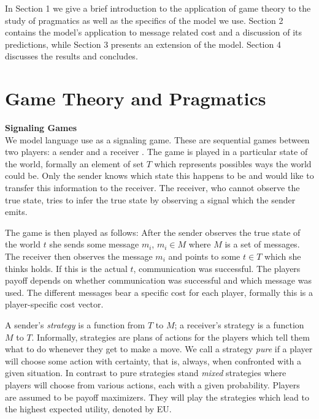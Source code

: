 \documentclass[10pt,a4paper]{article}
\begin{document}
In Section 1 we give a brief introduction to the application of game theory to the study of pragmatics as well as the specifics of the model we use.
Section 2 contains the model's application to message related cost and a discussion of its predictions, while Section 3 presents an extension of the model.
Section 4 discusses the results and concludes.
\section{Game Theory and Pragmatics}
\textbf{Signaling Games}\\
We model language use as a signaling game. These are sequential games between two players: a sender and a receiver \cite{david1969convention}. The game is played in a particular state of the world, formally an element of set $T$ which represents possibles ways the world could be. Only the sender knows which state this happens to be and would like to transfer this information to the receiver. The receiver, who cannot observe the true state, tries to infer the true state by observing a signal which the sender emits.

The game is then played as follows: After the sender observes the true state of the world $t$ she sends some message $m_i$, $m_i \in M$ where $M$ is a set of messages. The receiver then observes the message $m_i$ and points to some $t\in T$ which she thinks holds. If this is the actual $t$, communication was successful.
The players payoff depends on whether communication was successful and which message was used. The different messages bear a specific cost for each player, formally this is a player-specific cost vector.

A sender's \textit{strategy} is a function from $T$ to $M$; a receiver's strategy is a function $M$ to $T$. Informally, strategies are plans of actions for the players which tell them what to do whenever they get to make a move. We call a strategy \textit{pure} if a player will choose some action with certainty, that is, always, when confronted with a given situation. In contrast to pure strategies stand \textit{mixed} strategies where players will choose from various actions, each with a given probability.
Players are assumed to be payoff maximizers. They will play the strategies which lead to the highest expected utility, denoted by EU.
\end{document}
